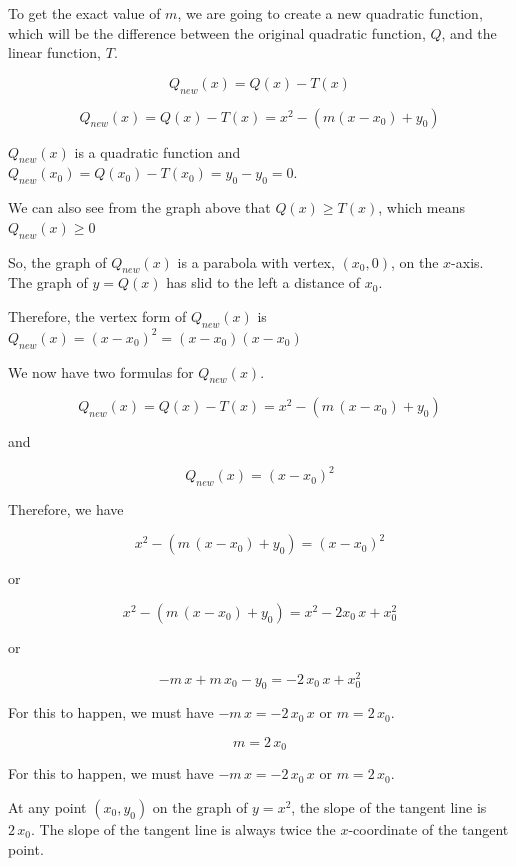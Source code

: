 \documentclass{ximera}
\begin{document}
To get the exact value of $m$, we are going to create a new quadratic function, which will be the difference between the original quadratic function, $Q$, and the linear function, $T$.



\begin{explanation}


\[
Q_{new}(x) = Q(x) - T(x) 
\]

\[
Q_{new}(x) = Q(x) - T(x) = x^2 - (m(x - x_0) + y_0)
\]




$Q_{new}(x)$ is a quadratic function and $Q_{new}(x_0) = Q(x_0) - T(x_0) = y_0 - y_0 = 0$. 


We can also see from the graph above that $Q(x) \geq T(x)$, which means $Q_{new}(x) \geq 0$


So, the graph of $Q_{new}(x)$ is a parabola with vertex, $(x_0, 0)$, on the $x$-axis.  The graph of $y = Q(x)$ has slid to the left a distance of $x_0$.  


Therefore, the vertex form of $Q_{new}(x)$ is $Q_{new}(x) = (x - x_0)^2 = (x - x_0)(x - x_0)$  


We now have two formulas for $Q_{new}(x)$.



\[
Q_{new}(x) = Q(x) - T(x) = x^2 - (m \, (x - x_0) + y_0) 
\]



and


\[
Q_{new}(x) = (x - x_0)^2
\]



Therefore, we have

\[
x^2 - (m \, (x - x_0) + y_0) =  (x - x_0)^2
\]


or


\[
x^2 - (m \, (x - x_0) + y_0) =  x^2 - 2 x_0 \, x + x_0^2
\]


or


\[
 -m \, x + m \, x_0 - y_0 =   - 2 \, x_0 \, x + x_0^2
\]


For this to happen, we must have $-m \, x = - 2 \, x_0 \, x$ or \textbf{$m = 2 \, x_0$}. 



\[  m = 2 \, x_0  \]

For this to happen, we must have $-m \, x = - 2 \, x_0 \, x$ or \textbf{$m = 2 \, x_0$}. 

\end{explanation}


At any point $(x_0, y_0)$ on the graph of $y = x^2$, the slope of the tangent line is $2 \, x_0$.  The slope of the tangent line is always twice the $x$-coordinate of the tangent point.
\end{document}
